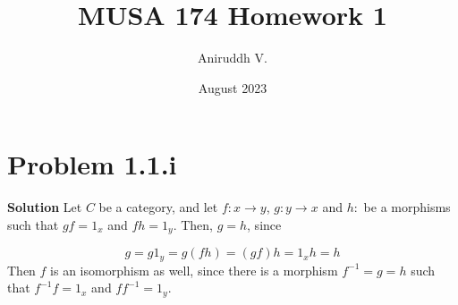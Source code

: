 \documentclass{article}
\title{MUSA 174 Homework 1}
\author{Aniruddh V.}
\date{August 2023}
\begin{document}
\maketitle

\section{Problem 1.1.i}

\textbf{Solution} Let $C$ be a category, and let $f: x \to y  $, $g: y \to x$ and $h: $  be a morphisms such that $gf = 1_x$ and $fh = 1_y$. Then, $g = h$, since

\begin{equation*}
    g = g1_y = g(fh) = (gf)h = 1_x h = h
\end{equation*}  Then $f$ is an isomorphism as well, since there is a morphism $f^{-1} = g = h$ such that $f^{-1}f = 1_x$ and $ff^{-1} = 1_y$.
\end{document}
